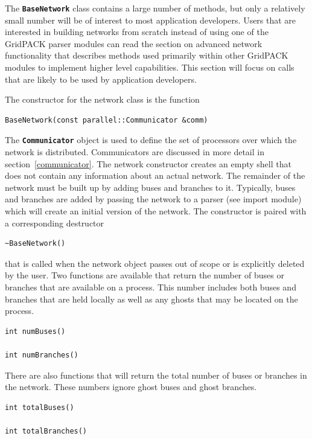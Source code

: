 The \texttt{\textbf{BaseNetwork}} class contains a large number of methods, but only a relatively small number will be of interest to most application developers. Users that are interested in building networks from scratch instead of using one of the GridPACK parser modules can read the section on advanced network functionality that describes methods used primarily within other GridPACK modules to implement higher level capabilities. This section will focus on calls that are likely to be used by application developers.

The constructor for the network class is the function

{
\color{red}
\begin{Verbatim}[fontseries=b]
BaseNetwork(const parallel::Communicator &comm)
\end{Verbatim}
}

The \texttt{\textbf{Communicator}} object is used to define the set of
processors over which the network is distributed. Communicators are discussed in
more detail in section~\ref{communicator}. The network constructor creates an empty shell that does not contain any information about an actual network. The remainder of the network must be built up by adding buses and branches to it. Typically, buses and branches are added by passing the network to a parser (see import module) which will create an initial version of the network. The constructor is paired with a corresponding destructor

{
\color{red}
\begin{Verbatim}[fontseries=b]
~BaseNetwork()
\end{Verbatim}
}

that is called when the network object passes out of scope or is explicitly deleted by the user.
Two functions are available that return the number of buses or branches that are available on a process. This number includes both buses and branches that are held locally as well as any ghosts that may be located on the process.

{
\color{red}
\begin{Verbatim}[fontseries=b]
int numBuses()

int numBranches()
\end{Verbatim}
}

There are also functions that will return the total number of buses or branches in the network. These numbers ignore ghost buses and ghost branches.

{
\color{red}
\begin{Verbatim}[fontseries=b]
int totalBuses()

int totalBranches()
\end{Verbatim}
}

